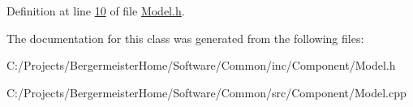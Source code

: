 Definition at line \mbox{\hyperlink{_model_8h_source_l00010}{10}} of file \mbox{\hyperlink{_model_8h_source}{Model.\+h}}.



The documentation for this class was generated from the following files\+:\begin{DoxyCompactItemize}
\item 
C\+:/\+Projects/\+Bergermeister\+Home/\+Software/\+Common/inc/\+Component/Model.\+h\item 
C\+:/\+Projects/\+Bergermeister\+Home/\+Software/\+Common/src/\+Component/Model.\+cpp\end{DoxyCompactItemize}
